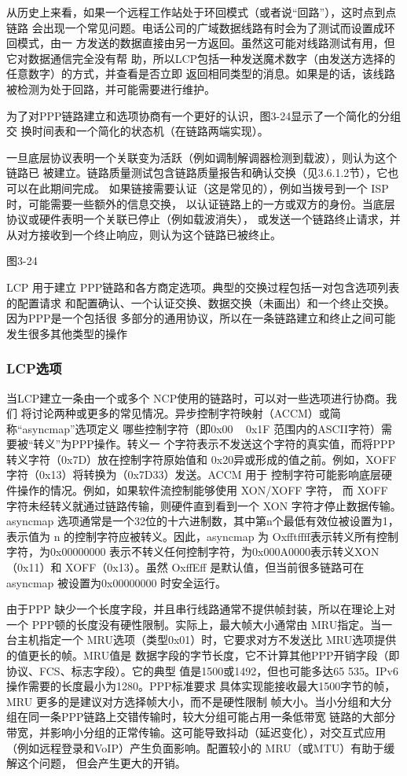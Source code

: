 从历史上来看，如果一个远程工作站处于环回模式（或者说“回路”），这时点到点链路
会出现一个常见问题。电话公司的广域数据线路有时会为了测试而设置成环回模式，由一
方发送的数据直接由另一方返回。虽然这可能对线路测试有用，但它对数据通信完全没有帮
助，所以LCP包括一种发送魔术数字（由发送方选择的任意数字）的方式，并查看是否立即
返回相同类型的消息。如果是的话，该线路被检测为处于回路，并可能需要进行维护。

为了对PPP链路建立和选项协商有一个更好的认识，图3-24显示了一个简化的分组交
换时间表和一个简化的状态机（在链路两端实现）。

一旦底层协议表明一个关联变为活跃（例如调制解调器检测到载波），则认为这个链路已
被建立。链路质量测试包含链路质量报告和确认交换（见3.6.1.2节），它也可以在此期间完成。
如果链接需要认证（这是常见的），例如当拨号到一个 ISP 时，可能需要一些额外的信息交换，
以认证链路上的一方或双方的身份。当底层协议或硬件表明一个关联已停止（例如载波消失），
或发送一个链路终止请求，并从对方接收到一个终止响应，则认为这个链路已被终止。

图3-24

LCP 用于建立 PPP链路和各方商定选项。典型的交换过程包括一对包含选项列表的配置请求
和配置确认、一个认证交换、数据交换（未画出）和一个终止交换。因为PPP是一个包括很
多部分的通用协议，所以在一条链路建立和终止之间可能发生很多其他类型的操作

\subsubsection{LCP选项}

当LCP建立一条由一个或多个 NCP使用的链路时，可以对一些选项进行协商。我们
将讨论两种或更多的常见情况。异步控制字符映射（ACCM）或简称“asyncmap”选项定义
哪些控制字符（即0x00 ~ 0x1F 范围内的ASCII字符）需要被“转义”为PPP操作。转义一
个字符表示不发送这个字符的真实值，而将PPP 转义字符（0x7D）放在控制字符原始值和
0x20异或形成的值之前。例如，XOFF字符（0x13）将转换为（0x7D33）发送。ACCM 用于
控制字符可能影响底层硬件操作的情况。例如，如果软件流控制能够使用 XON/XOFF 字符，
而 XOFF 字符未经转义就通过链路传输，则硬件直到看到一个 XON 字符才停止数据传输。
asyncmap 选项通常是一个32位的十六进制数，其中第n个最低有效位被设置为1，表示值为
n 的控制字符应被转义。因此，asyncmap 为 Oxfftffff表示转义所有控制字符，为0x00000000
表示不转义任何控制字符，为0x000A0000表示转义XON（0x11）和 XOFF（0x13）。虽然
OxffEff 是默认值，但当前很多链路可在 asyncmap 被设置为0x00000000 时安全运行。

由于PPP 缺少一个长度字段，并且串行线路通常不提供帧封装，所以在理论上对一个
PPP顿的长度没有硬性限制。实际上，最大帧大小通常由 MRU指定。当一台主机指定一个
MRU选项（类型0x01）时，它要求对方不发送比 MRU选项提供的值更长的帧。MRU值是
数据字段的字节长度，它不计算其他PPP开销字段（即协议、FCS、标志字段）。它的典型
值是1500或1492，但也可能多达65 535。IPv6 操作需要的长度最小为1280。PPP标准要求
具体实现能接收最大1500字节的帧，MRU 更多的是建议对方选择帧大小，而不是硬性限制
帧大小。当小分组和大分组在同一条PPP链路上交错传输时，较大分组可能占用一条低带宽
链路的大部分带宽，并影响小分组的正常传输。这可能导致抖动（延迟变化），对交互式应用
（例如远程登录和VoIP）产生负面影响。配置较小的 MRU（或MTU）有助于缓解这个问题，
但会产生更大的开销。

